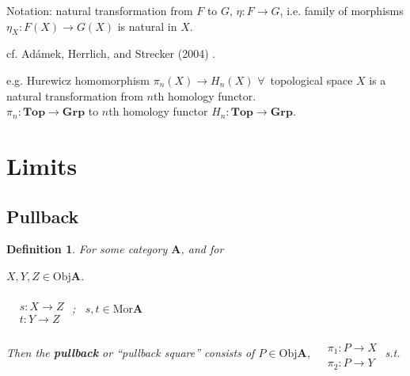 \documentclass[10pt]{amsart}
\newtheorem{definition}{Definition}
\begin{document}
\begin{multicols*}{2}
Notation: natural transformation from $F$ to $G$, $\eta:F \to G$, i.e. family of morphisms $\eta_X : F(X) \to G(X)$ is natural in $X$.


cf. Ad\'{a}mek, Herrlich, and Strecker (2004) \cite{AHS2004}. 

e.g. Hurewicz homomorphism $\pi_n(X) \to H_n(X)$ $\forall \, $ topological space $X$ is a natural transformation from $n$th homology functor. \\
$\pi_n : \textbf{Top} \to \mathbf{Grp}$ to $n$th homology functor $H_n : \textbf{Top} \to \textbf{Grp}$.



\section{Limits}

\subsection{Pullback}

\begin{definition}
	For some category $\mathbf{A}$, and for 
	
	
	$X,Y,Z \in \text{Obj}\mathbf{A}$.  
	
	$\begin{aligned} & \quad \\
	& s : X \to Z \\
	& t: Y \to Z \end{aligned}$ ; \qquad \, $s,t \in \text{Mor}\mathbf{A}$
	
	Then the \textbf{pullback} or ``pullback square'' consists of $P \in \text{Obj}\mathbf{A}$, $\begin{aligned} & \quad \\
	& \pi_1 : P \to X \\
	& \pi_2: P \to Y \end{aligned}$ s.t. 
	
	

\end{definition}
\end{multicols*}
\end{document}
